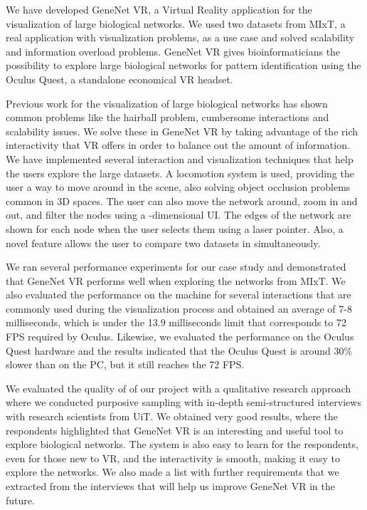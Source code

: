 We have developed GeneNet VR, a Virtual Reality application for the visualization of large biological networks. We used two datasets from MIxT, a real application with visualization problems, as a use case and solved scalability and information overload problems. GeneNet VR gives bioinformaticians the possibility to explore large biological networks for pattern identification using the Oculus Quest, a standalone economical VR headset.

Previous work for the visualization of large biological networks has shown common problems like the hairball problem, cumbersome interactions and scalability issues. We solve these in GeneNet VR by taking advantage of the rich interactivity that VR offers in order to balance out the amount of information. We have implemented several interaction and visualization techniques that help the users explore the large datasets. A locomotion system is used, providing the user a way to move around in the scene, also solving object occlusion problems common in 3D spaces. The user can also move the network around, zoom in and out, and filter the nodes using a -dimensional UI. The edges of the network are shown for each node when the user selects them using a laser pointer. Also, a novel feature allows the user to compare two datasets in simultaneously.

We ran several performance experiments for our case study and demonstrated that GeneNet VR performs well when exploring the networks from MIxT. We also evaluated the performance on the machine for several interactions that are commonly used during the visualization process and obtained an average of 7-8 milliseconds, which is under the 13.9 milliseconds limit that corresponds to 72 FPS required by Oculus. Likewise, we evaluated the performance on the Oculus Quest hardware and the results indicated that the Oculus Quest is around 30\% slower than on the PC, but it still reaches the 72 FPS.

We evaluated the quality of of our project with a qualitative research approach where we conducted purposive sampling with in-depth semi-structured interviews with research scientists from UiT. We obtained very good results, where the respondents highlighted that GeneNet VR is an interesting and useful tool to explore biological networks. The system is also easy to learn for the respondents, even for those new to VR, and the interactivity is smooth, making it easy to explore the networks. We also made a list with further requirements that we extracted from the interviews that will help us improve GeneNet VR in the future.

